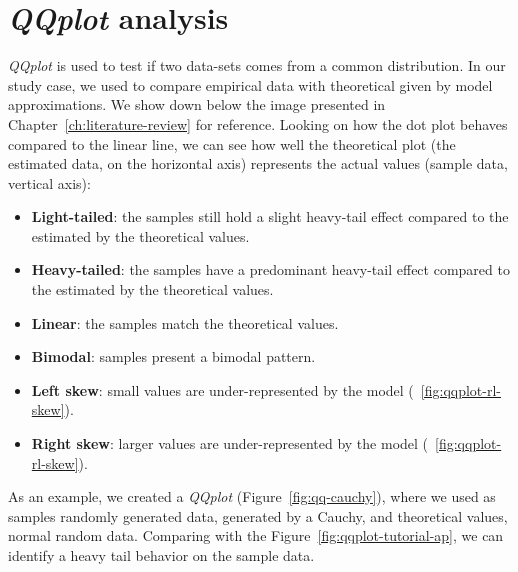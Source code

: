 \section{\textit{QQplot} analysis}

\textit{QQplot} is used to test if two data-sets comes from a common distribution\cite{web-qqplot}\cite{paper-qqplot}\cite{web-qq-tuto1}\cite{web-qq-tuto2}. In our study case, we used to compare empirical data with theoretical given by model approximations. We show down below the image presented in Chapter~\ref{ch:literature-review} for reference. 
Looking on how the dot plot behaves compared to the linear line, we can see how well the theoretical plot (the estimated data, on the horizontal axis) represents the actual values (sample data, vertical axis):

\begin{itemize}
\item \textbf{Light-tailed}: the samples still hold a slight heavy-tail effect compared to the estimated by the theoretical values.
\item \textbf{Heavy-tailed}: the samples have a predominant heavy-tail effect compared to the estimated by the theoretical values.
\item \textbf{Linear}: the samples match the theoretical values.
\item \textbf{Bimodal}: samples present a bimodal pattern.
\item \textbf{Left skew}: small values are under-represented by the model (~\ref{fig:qqplot-rl-skew}).
\item \textbf{Right skew}: larger values are under-represented by the model (~\ref{fig:qqplot-rl-skew}).
\end{itemize}



As an example, we created a \textit{QQplot} (Figure~\ref{fig:qq-cauchy}), where we used as samples randomly generated data, generated by a Cauchy, and theoretical values, normal random data. Comparing with the Figure~\ref{fig:qqplot-tutorial-ap}, we can identify a heavy tail behavior on the sample data.



